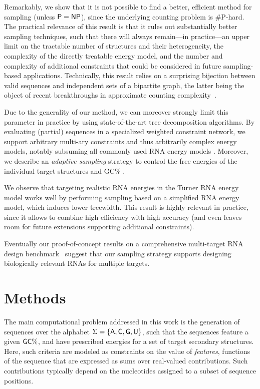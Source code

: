 \documentclass[]{bmcart}
\newcommand{\Def}[1]{\emph{#1}}
\newcommand{\Nuc}[1]{{\sf #1}}
\newcommand{\Ab}{\Nuc{A}}
\newcommand{\Cb}{\Nuc{C}}
\newcommand{\Gb}{\Nuc{G}}
\newcommand{\Ub}{\Nuc{U}}
\newcommand{\GCb}{\Gb\Cb}
\newcommand{\citep}[1]{\cite{#1}}
\newcommand{\revised}[1]{{\color{red} #1}}
\begin{document}
\revised{Remarkably, we show that it is not possible to find a better, efficient method for sampling (unless ${\sf P}={\sf NP}$), since the underlying counting problem is \#{\sf P}-hard. The practical relevance of this result is that it rules out substantially better sampling techniques, such that there will always remain---in practice---an upper limit on the tractable number of structures and their heterogeneity, the complexity of the directly treatable energy model, and the number and complexity of additional constraints that could be considered in future sampling-based applications.} Technically, this result relies on a surprising bijection between valid sequences and independent sets of a bipartite graph, the latter being the object of recent breakthroughs in approximate counting complexity~\citep{Bulatov2013,Cai2016}.

%
Due to the generality of our method, we can moreover strongly limit this parameter in practice by using state-of-the-art tree decomposition algorithms.
By evaluating (partial) sequences in a specialized weighted constraint
network, we support arbitrary multi-ary constraints and thus
arbitrarily complex energy models,
notably subsuming all commonly
used RNA energy models%
.  Moreover, we describe an \Def{adaptive
  sampling} strategy to control the free energies of the individual
target structures and \GCb\%%
. %





We observe that
targeting realistic RNA energies in the
Turner RNA energy model
works well by performing sampling based on \revised{a simplified RNA energy model, which induces lower treewidth}. This result is highly relevant in practice, since it allows to combine high efficiency with high accuracy (and even leaves room for \revised{future extensions supporting additional constraints}).

\revised{Eventually our proof-of-concept results 
 on a comprehensive multi-target RNA design benchmark~\citep{Taneda2015} 
  suggest that our sampling strategy supports designing biologically relevant
RNAs for multiple targets.} 

\section*{Methods}
The main computational problem addressed in this work is the generation of sequences over the alphabet $\Sigma=\{\Ab,\Cb,\Gb,\Ub\}$, \revised{such that the sequences feature a given $\GCb\%$, and have prescribed energies for a set of target secondary structures.
Here, such criteria are modeled} as constraints on the value of \Def{features}, functions of the sequence that are expressed as sums over real-valued contributions. Such contributions typically depend on the nucleotides assigned to a subset of sequence positions.
\end{document}

